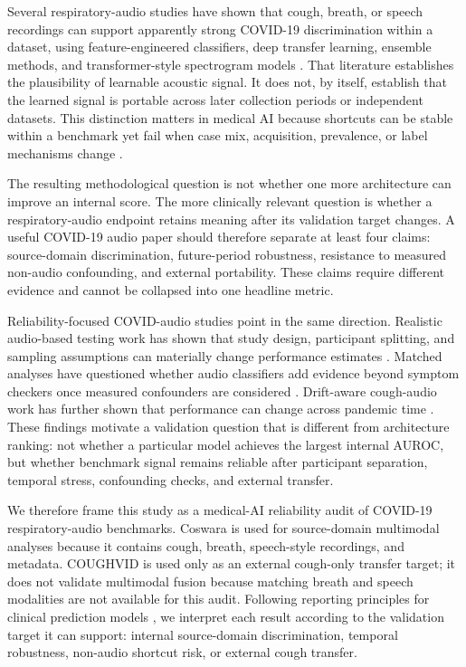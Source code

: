 \documentclass[11pt]{article}
\begin{document}
Several respiratory-audio studies have shown that cough, breath, or speech recordings can support apparently strong COVID-19 discrimination within a dataset, using feature-engineered classifiers, deep transfer learning, ensemble methods, and transformer-style spectrogram models \citep{pahar2021global,pahar2022transfer,chowdhury2022mcdm,aytekin2024hst,islam2026dndf}. That literature establishes the plausibility of learnable acoustic signal. It does not, by itself, establish that the learned signal is portable across later collection periods or independent datasets. This distinction matters in medical AI because shortcuts can be stable within a benchmark yet fail when case mix, acquisition, prevalence, or label mechanisms change \citep{geirhos2020shortcut,wynants2020prediction,roberts2021common}.

The resulting methodological question is not whether one more architecture can improve an internal score. The more clinically relevant question is whether a respiratory-audio endpoint retains meaning after its validation target changes. A useful COVID-19 audio paper should therefore separate at least four claims: source-domain discrimination, future-period robustness, resistance to measured non-audio confounding, and external portability. These claims require different evidence and cannot be collapsed into one headline metric.

Reliability-focused COVID-audio studies point in the same direction. Realistic audio-based testing work has shown that study design, participant splitting, and sampling assumptions can materially change performance estimates \citep{han2022sounds}. Matched analyses have questioned whether audio classifiers add evidence beyond symptom checkers once measured confounders are considered \citep{coppock2024audio}. Drift-aware cough-audio work has further shown that performance can change across pandemic time \citep{ganitidis2025jmir}. These findings motivate a validation question that is different from architecture ranking: not whether a particular model achieves the largest internal AUROC, but whether benchmark signal remains reliable after participant separation, temporal stress, confounding checks, and external transfer.

We therefore frame this study as a medical-AI reliability audit of COVID-19 respiratory-audio benchmarks. Coswara is used for source-domain multimodal analyses because it contains cough, breath, speech-style recordings, and metadata. COUGHVID is used only as an external cough-only transfer target; it does not validate multimodal fusion because matching breath and speech modalities are not available for this audit. Following reporting principles for clinical prediction models \citep{collins2024tripodai}, we interpret each result according to the validation target it can support: internal source-domain discrimination, temporal robustness, non-audio shortcut risk, or external cough transfer.
\end{document}
